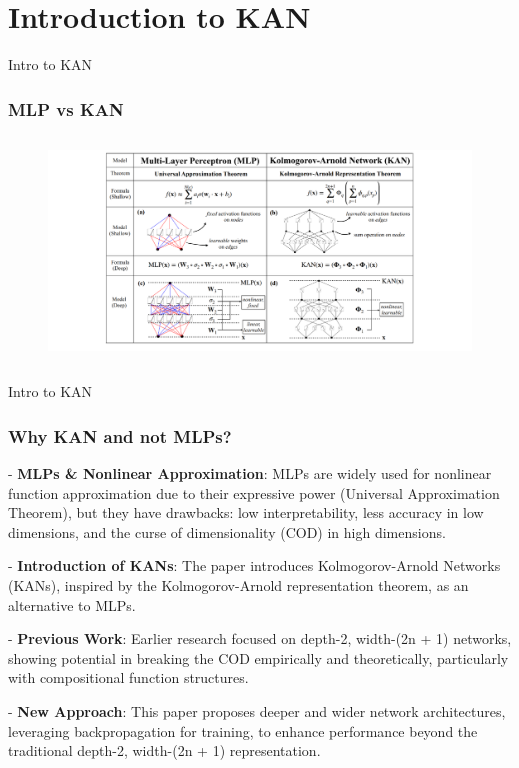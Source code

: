 \documentclass[serif, aspectratio=169]{beamer}
\begin{document}
\section{Introduction to KAN}
\begin{frame}{Intro to KAN}
    \frametitle<presentation>{MLP vs KAN}
    \begin{figure}
        \centering
        \includegraphics[height=6cm]{image copy 7.png}
    \end{figure}
\end{frame}
\begin{frame}{Intro to KAN}
    \frametitle<presentation>{Why KAN and not MLPs?}
    - \textbf{MLPs \& Nonlinear Approximation}: MLPs are widely used for nonlinear function approximation due to their expressive power (Universal Approximation Theorem), but they have drawbacks: low interpretability, less accuracy in low dimensions, and the curse of dimensionality (COD) in high dimensions.

    - \textbf{Introduction of KANs}: The paper introduces Kolmogorov-Arnold Networks (KANs), inspired by the Kolmogorov-Arnold representation theorem, as an alternative to MLPs.

    - \textbf{Previous Work}: Earlier research focused on depth-2, width-(2n + 1) networks, showing potential in breaking the COD empirically and theoretically, particularly with compositional function structures.

    - \textbf{New Approach}: This paper proposes deeper and wider network architectures, leveraging backpropagation for training, to enhance performance beyond the traditional depth-2, width-(2n + 1) representation.
\end{frame}
\end{document}
